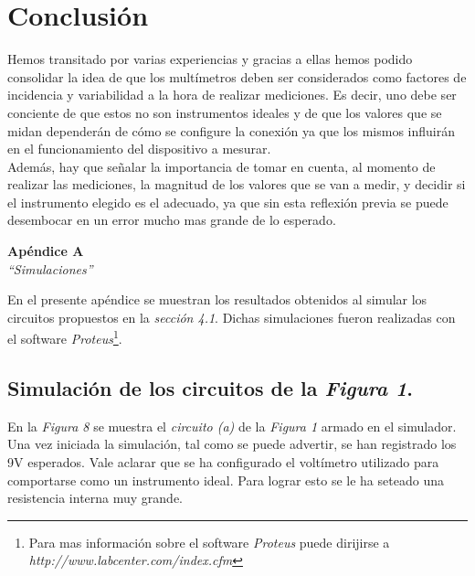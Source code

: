 \documentclass{article}
\begin{document}
\section{Conclusión}

	Hemos transitado por varias experiencias y gracias a ellas hemos podido consolidar la idea de que los multímetros deben ser considerados como factores de incidencia y variabilidad a la hora de realizar mediciones. Es decir, uno debe ser conciente de que estos no son instrumentos ideales y de que los valores que se midan dependerán de cómo se configure la conexión ya que los mismos influirán en el funcionamiento del dispositivo a mesurar. \\
\indent Además, hay que señalar la importancia  de tomar en cuenta, al momento de realizar las mediciones, la magnitud de los valores que se van a medir, y decidir si el instrumento elegido es el adecuado, ya que sin esta reflexión previa se puede desembocar en un error mucho mas grande de lo esperado.  





\newpage
\vspace*{4cm}
\begin{center}
	\textbf{\Huge{Apéndice A}} \\
	\bigskip\bigskip
	\Large{\textit{``Simulaciones''}}
\end{center}


\newpage \textit{}
\newpage

	En el presente apéndice se muestran los resultados obtenidos al simular los circuitos propuestos en la \textit{sección 4.1}. Dichas simulaciones fueron realizadas con el software \textit{Proteus}\footnote{Para mas información sobre el software \textit{Proteus} puede dirijirse a \textit{http://www.labcenter.com/index.cfm}}.
\bigskip \bigskip


\subsection*{Simulación de los circuitos de la \textit{Figura 1}.}
\medskip

	En la \textit{Figura 8} se muestra el \textit{circuito (a)} de la \textit{Figura 1} armado en el simulador. Una vez iniciada la simulación, tal como se puede advertir, se han registrado los 9V esperados. Vale aclarar que se ha configurado el voltímetro utilizado para comportarse como un instrumento ideal. Para lograr esto se le ha seteado una resistencia interna muy grande.
\medskip
\end{document}
